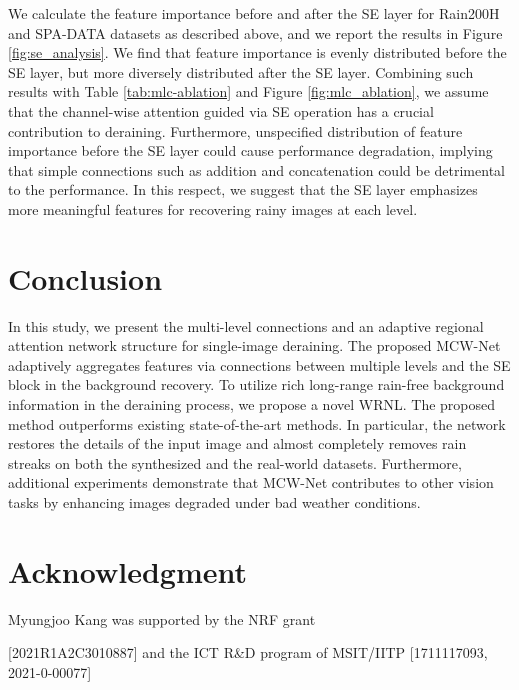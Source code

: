 \documentclass[a4paper,fleqn]{cas-dc}
\begin{document}
We calculate the feature importance before and after the SE layer for Rain200H and SPA-DATA datasets as described above, and we report the results in Figure \ref{fig:se_analysis}. We find that feature importance is evenly distributed before the SE layer, but more diversely distributed after the SE layer. Combining such results with Table \ref{tab:mlc-ablation} and Figure \ref{fig:mlc_ablation}, we assume that the channel-wise attention guided via SE operation has a crucial contribution to deraining. Furthermore, unspecified distribution of feature importance before the SE layer could cause performance degradation, implying that simple connections such as addition and concatenation could be detrimental to the performance. In this respect, we suggest that the SE layer emphasizes more meaningful features for recovering rainy images at each level.





















\section{Conclusion}
In this study, we present the multi-level connections and an adaptive regional attention network structure for single-image deraining. The proposed MCW-Net adaptively aggregates features via connections between multiple levels and the SE block in the background recovery. To utilize rich long-range rain-free background information in the deraining process, we propose a novel WRNL.
The proposed method outperforms existing state-of-the-art methods. In particular, the network restores the details of the input image and almost completely removes rain streaks on both the synthesized and the real-world datasets. Furthermore, additional experiments demonstrate that MCW-Net contributes to other vision tasks by enhancing images degraded under bad weather conditions.

\section*{Acknowledgment}
Myungjoo Kang was supported by the NRF grant

[2021R1A2C3010887] and the ICT R\&D program of
MSIT/IITP [1711117093, 2021-0-00077]























\printcredits





\bio{}
\endbio

\bio{}
\endbio
\end{document}
